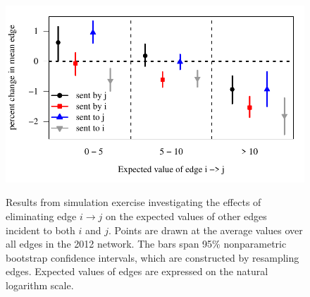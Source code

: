\documentclass[reqno,onecolumn,letterpaper,12pt]{article}
\begin{document}
\begin{figure}[!h]
\centering
\includegraphics[scale=.85]{./draft_figures/contagion_simulation_results} \vspace{-.5cm}\\
\caption{\label{fig:contagion} Results from simulation exercise investigating the effects of eliminating edge $i \rightarrow j$ on the expected values of other edges incident to both $i$ and $j$. Points are drawn at the average values over all edges in the 2012 network. The bars span 95\% nonparametric bootstrap confidence intervals, which are constructed by resampling edges.  Expected values of edges are expressed on the natural logarithm scale.}
\end{figure}
\end{document}
